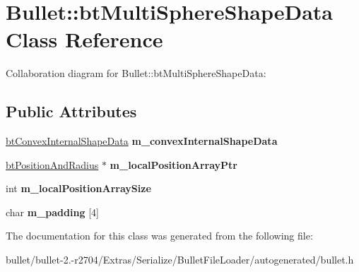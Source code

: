 \hypertarget{class_bullet_1_1bt_multi_sphere_shape_data}{\section{Bullet\+:\+:bt\+Multi\+Sphere\+Shape\+Data Class Reference}
\label{class_bullet_1_1bt_multi_sphere_shape_data}
}


Collaboration diagram for Bullet\+:\+:bt\+Multi\+Sphere\+Shape\+Data\+:
\subsection*{Public Attributes}
\begin{DoxyCompactItemize}
\item 
\hypertarget{class_bullet_1_1bt_multi_sphere_shape_data_aa31c9447f5a4b76417c73558d6cadc73}{\hyperlink{class_bullet_1_1bt_convex_internal_shape_data}{bt\+Convex\+Internal\+Shape\+Data} {\bfseries m\+\_\+convex\+Internal\+Shape\+Data}}\label{class_bullet_1_1bt_multi_sphere_shape_data_aa31c9447f5a4b76417c73558d6cadc73}

\item 
\hypertarget{class_bullet_1_1bt_multi_sphere_shape_data_a6aa641c4c1ec981c137be90e00970b62}{\hyperlink{class_bullet_1_1bt_position_and_radius}{bt\+Position\+And\+Radius} $\ast$ {\bfseries m\+\_\+local\+Position\+Array\+Ptr}}\label{class_bullet_1_1bt_multi_sphere_shape_data_a6aa641c4c1ec981c137be90e00970b62}

\item 
\hypertarget{class_bullet_1_1bt_multi_sphere_shape_data_a61c64c705111cda54d560202aec27d72}{int {\bfseries m\+\_\+local\+Position\+Array\+Size}}\label{class_bullet_1_1bt_multi_sphere_shape_data_a61c64c705111cda54d560202aec27d72}

\item 
\hypertarget{class_bullet_1_1bt_multi_sphere_shape_data_a82bd69af0a047b52e2a201462039349c}{char {\bfseries m\+\_\+padding} \mbox{[}4\mbox{]}}\label{class_bullet_1_1bt_multi_sphere_shape_data_a82bd69af0a047b52e2a201462039349c}

\end{DoxyCompactItemize}


The documentation for this class was generated from the following file\+:\begin{DoxyCompactItemize}
\item 
bullet/bullet-\/2.-\/r2704/\+Extras/\+Serialize/\+Bullet\+File\+Loader/autogenerated/bullet.\+h\end{DoxyCompactItemize}

